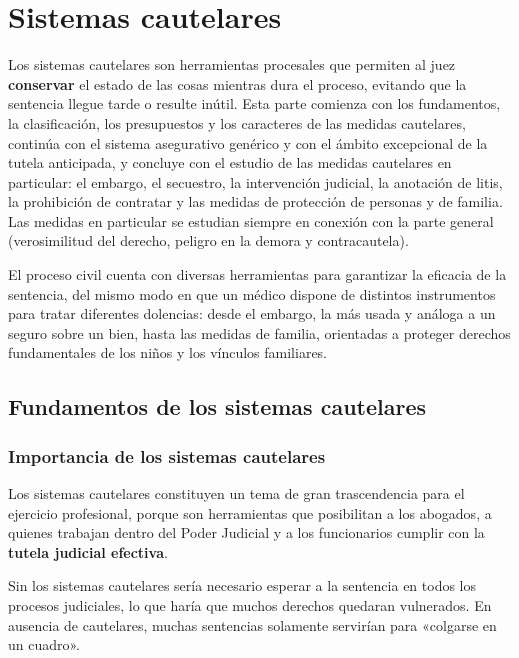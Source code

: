 \documentclass[12pt,oneside]{book}
\begin{document}
\part{Sistemas cautelares}
Los sistemas cautelares son herramientas procesales que permiten al juez \textbf{conservar} el estado de las cosas mientras dura el proceso, evitando que la sentencia llegue tarde o resulte inútil. Esta parte comienza con los fundamentos, la clasificación, los presupuestos y los caracteres de las medidas cautelares, continúa con el sistema asegurativo genérico y con el ámbito excepcional de la tutela anticipada, y concluye con el estudio de las medidas cautelares en particular: el embargo, el secuestro, la intervención judicial, la anotación de litis, la prohibición de contratar y las medidas de protección de personas y de familia. Las medidas en particular se estudian siempre en conexión con la parte general (verosimilitud del derecho, peligro en la demora y contracautela).

El proceso civil cuenta con diversas herramientas para garantizar la eficacia de la sentencia, del mismo modo en que un médico dispone de distintos instrumentos para tratar diferentes dolencias: desde el embargo, la más usada y análoga a un seguro sobre un bien, hasta las medidas de familia, orientadas a proteger derechos fundamentales de los niños y los vínculos familiares.

\chapter[Fundamentos de los sistemas cautelares]{Fundamentos de los sistemas cautelares}\label{cap:fundamentos-cautelares}


\section{Importancia de los sistemas cautelares}

Los sistemas cautelares constituyen un tema de gran trascendencia para el ejercicio profesional, porque son herramientas que posibilitan a los abogados, a quienes trabajan dentro del Poder Judicial y a los funcionarios cumplir con la \textbf{tutela judicial efectiva}.

Sin los sistemas cautelares sería necesario esperar a la sentencia en todos los procesos judiciales, lo que haría que muchos derechos quedaran vulnerados. En ausencia de cautelares, muchas sentencias solamente servirían para «colgarse en un cuadro».
\end{document}
